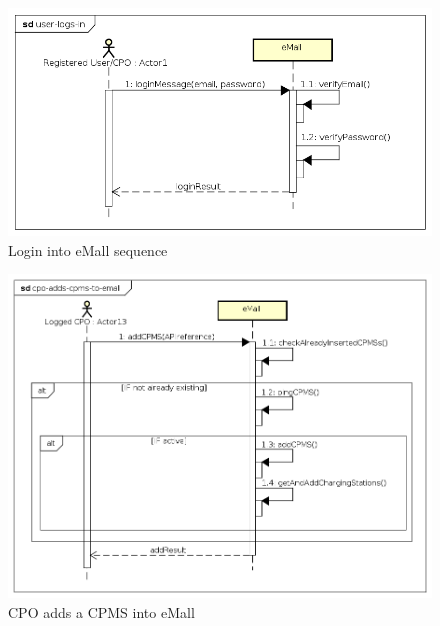 \begin{figure}[!h]
    \begin{center}
        \includegraphics[keepaspectratio, width=16cm]{Sequence/user-logs-in.png}
        \caption{Login into \ac{eMall} sequence}
    \end{center}
\end{figure}
\begin{figure}[!h]
    \begin{center}
        \includegraphics[keepaspectratio, width=16cm]{Sequence/cpo-adds-cpms-to-emall.png}
        \caption{\ac{CPO} adds a \ac{CPMS} into eMall}
    \end{center}
\end{figure}
